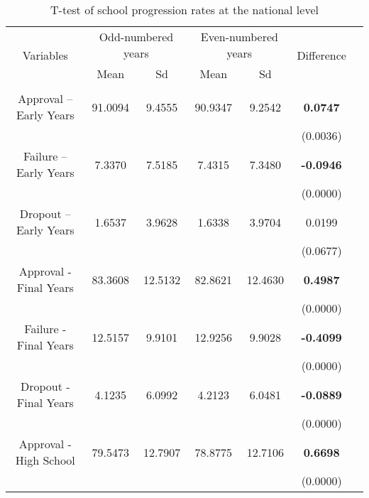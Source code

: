 \begin{table}[htbp]
    \centering
    \caption{T-test of school progression rates at the national level}
        \begin{tabular}{ccccccc}
        \toprule
        \multirow{2}[4]{*}{Variables} & \multicolumn{2}{c}{Odd-numbered years} & \multicolumn{2}{c}{Even-numbered years} & \multirow{2}[4]{*}{Difference} \\
        \cmidrule(r){2-3} \cmidrule(r){4-5}
        & Mean & Sd & Mean & Sd &  \\
        \midrule \\
        Approval – Early Years   & 91.0094 & 9.4555 & 90.9347 & 9.2542 & \textbf{0.0747} \\ 
                     &          &         &          &         & (0.0036) \\
    
        Failure – Early Years  & 7.3370 & 7.5185 & 7.4315 & 7.3480 & \textbf{-0.0946} \\ 
                     &          &         &          &         & (0.0000) \\
    
        Dropout – Early Years    & 1.6537 & 3.9628 & 1.6338 & 3.9704 & 0.0199 \\ 
                     &          &         &          &         & (0.0677) \\
    
        Approval - Final Years   & 83.3608 & 12.5132 & 82.8621 & 12.4630 & \textbf{0.4987} \\ 
                     &          &         &          &         & (0.0000) \\
    
        Failure - Final Years  & 12.5157 & 9.9101 & 12.9256 & 9.9028 & \textbf{-0.4099} \\ 
                     &          &         &          &         & (0.0000) \\
    
        Dropout - Final Years    & 4.1235 & 6.0992 & 4.2123 & 6.0481 & \textbf{-0.0889} \\ 
                     &          &         &          &         & (0.0000) \\
    
        Approval - High School   & 79.5473 & 12.7907 & 78.8775 & 12.7106 & \textbf{0.6698} \\ 
                     &          &         &          &         & (0.0000) \\
    

\end{tabular}
\end{table}
